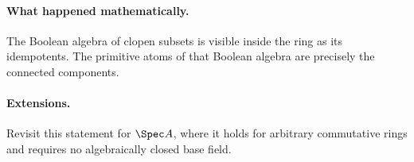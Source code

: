 \paragraph{What happened mathematically.}
The Boolean algebra of clopen subsets is visible inside the ring as its idempotents.  The
primitive atoms of that Boolean algebra are precisely the connected components.
\paragraph{Extensions.}
Revisit this statement for \(\Spec A\), where it holds for arbitrary commutative rings and
requires no algebraically closed base field.
\fi
